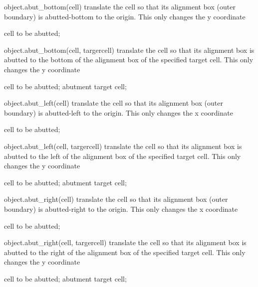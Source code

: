 \begin{APIfunc}{object.abut\_bottom(cell)}
    translate the cell so that its alignment box (outer boundary) is abutted-bottom to the origin. This only changes the y coordinate
    \begin{APIparameters}
            cell to be abutted;
    \end{APIparameters}
\end{APIfunc}
\begin{APIfunc}{object.abut\_bottom(cell, targercell)}
    translate the cell so that its alignment box is abutted to the bottom of the alignment box of the specified target cell. This only changes the y coordinate
    \begin{APIparameters}
            cell to be abutted;
            abutment target cell;
    \end{APIparameters}
\end{APIfunc}
\begin{APIfunc}{object.abut\_left(cell)}
    translate the cell so that its alignment box (outer boundary) is abutted-left to the origin. This only changes the x coordinate
    \begin{APIparameters}
            cell to be abutted;
    \end{APIparameters}
\end{APIfunc}
\begin{APIfunc}{object.abut\_left(cell, targercell)}
    translate the cell so that its alignment box is abutted to the left of the alignment box of the specified target cell. This only changes the y coordinate
    \begin{APIparameters}
            cell to be abutted;
            abutment target cell;
    \end{APIparameters}
\end{APIfunc}
\begin{APIfunc}{object.abut\_right(cell)}
    translate the cell so that its alignment box (outer boundary) is abutted-right to the origin. This only changes the x coordinate
    \begin{APIparameters}
            cell to be abutted;
    \end{APIparameters}
\end{APIfunc}
\begin{APIfunc}{object.abut\_right(cell, targercell)}
    translate the cell so that its alignment box is abutted to the right of the alignment box of the specified target cell. This only changes the y coordinate
    \begin{APIparameters}
            cell to be abutted;
            abutment target cell;
    \end{APIparameters}
\end{APIfunc}
